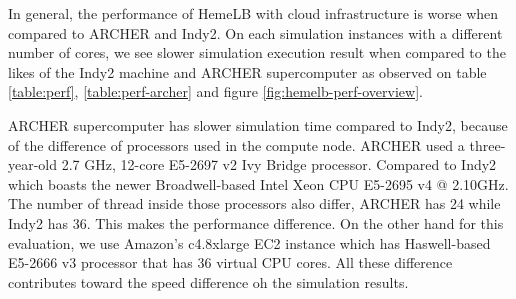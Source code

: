 \vspace{1cm}

\noindent%
\begin{minipage}{\linewidth}%
 \label{fig:hemelb-perf-overview}%
\end{minipage}

\vspace{1cm}


In general, the performance of HemeLB with cloud infrastructure is worse when compared to ARCHER and Indy2. On each simulation instances with a different number of cores, we see slower simulation execution result when compared to the likes of the Indy2 machine and ARCHER supercomputer as observed on table \ref{table:perf}, \ref{table:perf-archer} and figure \ref{fig:hemelb-perf-overview}.

ARCHER supercomputer has slower simulation time compared to Indy2, because of the difference of processors used in the compute node. ARCHER used a three-year-old 2.7 GHz, 12-core E5-2697 v2 Ivy Bridge processor. Compared to Indy2 which boasts the newer Broadwell-based Intel Xeon CPU E5-2695 v4 @ 2.10GHz. The number of thread inside those processors also differ, ARCHER has 24 while Indy2 has 36. This makes the performance difference. On the other hand for this evaluation, we use Amazon's c4.8xlarge EC2 instance which has Haswell-based E5-2666 v3 processor that has 36 virtual CPU cores. All these difference contributes toward the speed difference oh the simulation results.

